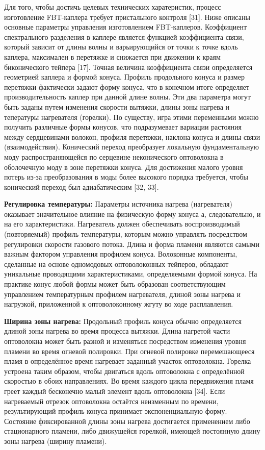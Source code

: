 Для того, чтобы достичь целевых технических харатеристик, процесс изготовление FBT-каплера требует пристального контроля [31]. Ниже описаны основные параметры управления изготовлением FBT-каплеров. Коэффициент спектрального разделения в каплере является функцией коэффициента связи, который зависит от длины волны и варьирующийся от точки к точке вдоль каплера, максимален в перетяжке и снижается при движении к краям биконического тейпера [17]. Точная величина коэффициента связи определяется геометрией каплера и формой конуса. Профиль продольного конуса и размер перетяжки фактически задают форму конуса, что в конечном итоге определяет производительность каплер при данной длине волны. Эти два параметра могут быть заданы путем изменения скорости вытяжки, длины зоны нагрева и тепературы нагревателя (горелки). По существу, игра этими переменными можно получить различные формы конусов, что подразумевает вариации растояния между сердцевинами волокон, профиля перетяжки, наклона конуса и длины связи (взаимодействия). Конический переход преобразует локальную фундаментальную моду распространяющейся по серцевине неконического оптоволокна в оболочечную моду в зоне перетяжки конуса. Для достижения малого уровня потерь из-за преобразования в моды более высокого порядка требуется, чтобы конический переход был адиабатическим [32, 33].

\textbf{Регулировка температуры:} Параметры источника нагрева (нагревателя) оказывает значительное влияние на физическую форму конуса а, следовательно, и на его характеристики. Нагреватель должен обеспечивать воспроизводимый (повторяемый) профиль температуры, которым можно управлять посредством регулировки скорости газового потока. Длина и форма пламени являются самыми важным фактором управления профилем конуса. Волоконные компоненты, сделанные на основе одномодовых оптоволоконных тейперов, обладают уникальные проводящими характеристиками, определяемыми формой конуса. На практике конус любой формы может быть образован соответствующим управлением температурным профилем нагревателя, длиной зоны нагрева и нагрузкой, приложенной к оптоволоконному жгуту во ходе расплавления.

\textbf{Ширина зоны нагрева:} Продольный профиль конуса обычно определяется длиной зоны нагрева во время процесса вытяжки. Длина нагретой части оптоволокна может быть разной и изменяться посредством изменения уровня пламени во время огневой полировки. При огневой полировке перемешающееся пламя в определённое время нагревает заданный участок оптоволокна. Горелка устроена таким образом, чтобы двигаться вдоль оптоволокна с определённой скоростью в обоих направлениях. Во время каждого цикла передвижения пламя греет каждый бесконечно малый элемент вдоль оптоволокна [34]. Если нагреваемый отрезок оптоволокна остаётся неизменным по времени, результирующий профиль конуса принимает экспоненциальную форму. Состояние фиксированной длины зоны нагрева достигается применением либо стационарного пламени, либо движущейся горелкой, имеющей постоянную длину зоны нагрева (ширину пламени).

